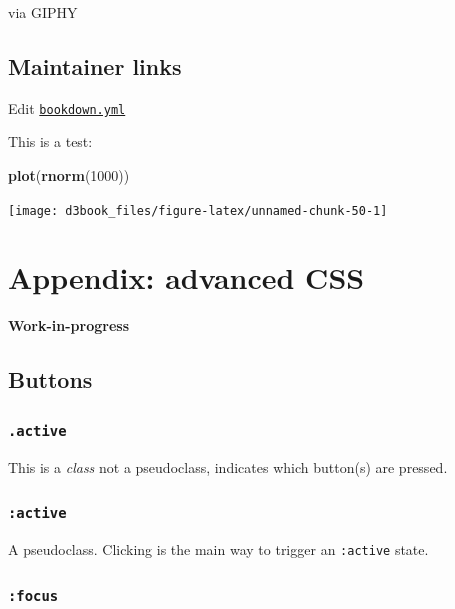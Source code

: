 \documentclass[
  openany]{book}
\newenvironment{Shaded}{\begin{snugshade}}{\end{snugshade}}
\newcommand{\DecValTok}[1]{\textcolor[rgb]{0.00,0.00,0.81}{#1}}
\newcommand{\KeywordTok}[1]{\textcolor[rgb]{0.13,0.29,0.53}{\textbf{#1}}}
\newcommand{\NormalTok}[1]{#1}
\begin{document}
via GIPHY

\hypertarget{maintainer-links}{%
\section{Maintainer links}\label{maintainer-links}}

Edit \href{https://github.com/jtr13/d3book/edit/master/_bookdown.yml}{\texttt{bookdown.yml}}

This is a test:

\begin{Shaded}
\begin{Highlighting}[]
\KeywordTok{plot}\NormalTok{(}\KeywordTok{rnorm}\NormalTok{(}\DecValTok{1000}\NormalTok{))}
\end{Highlighting}
\end{Shaded}

\texttt{[image: d3book\_files/figure-latex/unnamed-chunk-50-1]}

\hypertarget{appendix-advanced-css}{%
\chapter{Appendix: advanced CSS}\label{appendix-advanced-css}}

\textbf{Work-in-progress}

\hypertarget{buttons}{%
\section{Buttons}\label{buttons}}

\hypertarget{active}{%
\subsection{\texorpdfstring{\texttt{.active}}{.active}}\label{active}}

This is a \emph{class} not a pseudoclass, indicates which button(s) are pressed.

\hypertarget{active-1}{%
\subsection{\texorpdfstring{\texttt{:active}}{:active}}\label{active-1}}

A pseudoclass. Clicking is the main way to trigger an \texttt{:active} state.

\hypertarget{focus}{%
\subsection{\texorpdfstring{\texttt{:focus}}{:focus}}\label{focus}}
\end{document}
